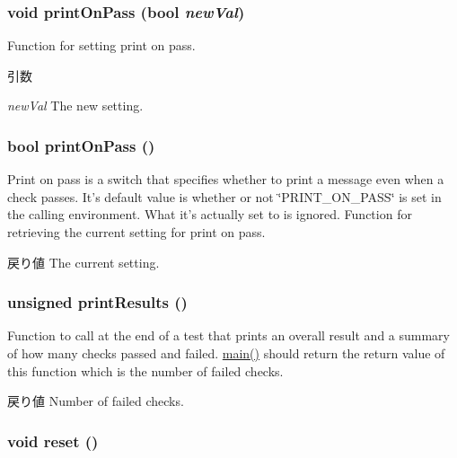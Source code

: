 \hypertarget{namespaceUnitTest_a6b02bd4200bdf54eee13e52e4dae4625}{
\subsubsection[{printOnPass}]{\setlength{\rightskip}{0pt plus 5cm}void printOnPass (bool {\em newVal})}}
\label{namespaceUnitTest_a6b02bd4200bdf54eee13e52e4dae4625}
Function for setting print on pass. 
\begin{DoxyParams}{引数}
\item[{\em newVal}]The new setting. \end{DoxyParams}
\hypertarget{namespaceUnitTest_a4fe39db6ba9297515e7cd97e88c6ad78}{
\subsubsection[{printOnPass}]{\setlength{\rightskip}{0pt plus 5cm}bool printOnPass ()}}
\label{namespaceUnitTest_a4fe39db6ba9297515e7cd97e88c6ad78}
Print on pass is a switch that specifies whether to print a message even when a check passes. It's default value is whether or not \char`\"{}PRINT\_\-ON\_\-PASS\char`\"{} is set in the calling environment. What it's actually set to is ignored. Function for retrieving the current setting for print on pass. \begin{DoxyReturn}{戻り値}
The current setting. 
\end{DoxyReturn}
\hypertarget{namespaceUnitTest_a19207173d818ba00e0b61392a76e04e9}{
\subsubsection[{printResults}]{\setlength{\rightskip}{0pt plus 5cm}unsigned printResults ()}}
\label{namespaceUnitTest_a19207173d818ba00e0b61392a76e04e9}
Function to call at the end of a test that prints an overall result and a summary of how many checks passed and failed. \hyperlink{namespaceslicc_1_1main_aa4ab6984fcc6ca3c4400301d7ce54798}{main()} should return the return value of this function which is the number of failed checks. \begin{DoxyReturn}{戻り値}
Number of failed checks. 
\end{DoxyReturn}
\hypertarget{namespaceUnitTest_ad20897c5c8bd47f5d4005989bead0e55}{
\subsubsection[{reset}]{\setlength{\rightskip}{0pt plus 5cm}void reset ()}}
\label{namespaceUnitTest_ad20897c5c8bd47f5d4005989bead0e55}


